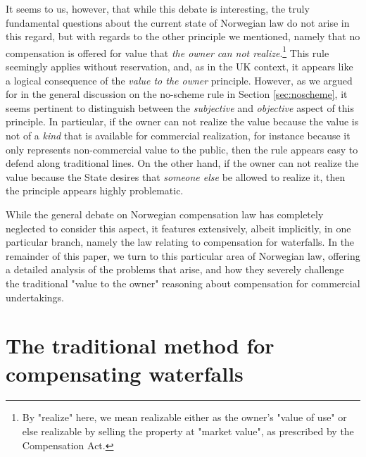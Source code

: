 It seems to us, however, that while this debate is interesting, the truly fundamental questions about the current state of Norwegian law do not arise in this regard, but with regards to the other principle we mentioned, namely that no compensation is offered for value that \emph{the owner can not realize}.\footnote{By "realize" here, we mean realizable either as the owner's "value of use" or else realizable by selling the property at "market value", as prescribed by the Compensation Act.} This rule seemingly applies without reservation, and, as in the UK context, it appears like a logical consequence of the \emph{value to the owner} principle. However, as we argued for in the general discussion on the no-scheme rule in Section \ref{sec:noscheme}, it seems pertinent to distinguish between the \emph{subjective} and \emph{objective} aspect of this principle. In particular, if the owner can not realize the value because the value is not of a \emph{kind} that is available for commercial realization, for instance because it only represents non-commercial value to the public, then the rule appears easy to defend along traditional lines. On the other hand, if the owner can not realize the value because the State desires that \emph{someone else} be allowed to realize it, then the principle appears highly problematic.

While the general debate on Norwegian compensation law has completely neglected to consider this aspect, it features extensively, albeit implicitly, in one particular branch, namely the law relating to compensation for waterfalls. In the remainder of this paper, we turn to this particular area of Norwegian law, offering a detailed analysis of the problems that arise, and how they severely challenge the traditional "value to the owner" reasoning about compensation for commercial undertakings. 

\section{The traditional method for compensating waterfalls}\label{sec:trad}

